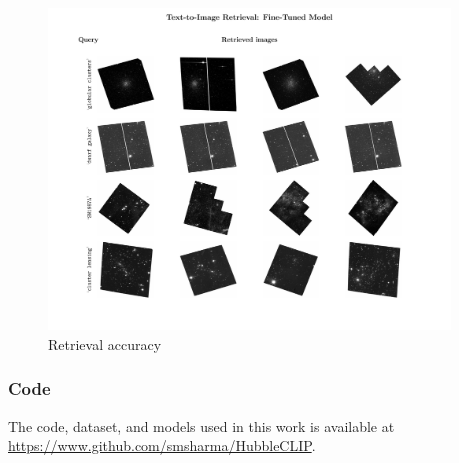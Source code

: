 \documentclass[10pt]{article} %
\begin{document}
\begin{figure}[!h]
\includegraphics[width=0.95\textwidth]{plots/tti.pdf}
\caption{Retrieval accuracy}
\label{fig:tti_base}
\end{figure}




\subsubsection*{Code}

The code, dataset, and models used in this work is available at \url{https://www.github.com/smsharma/HubbleCLIP}.
\end{document}
